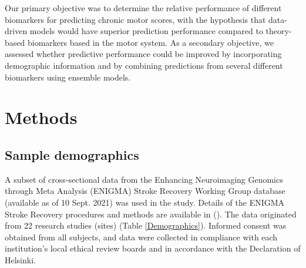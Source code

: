 \documentclass[phd,tocprelim]{cornell}
\begin{document}
Our primary objective was to determine the relative performance of different biomarkers for predicting chronic motor scores, with the hypothesis that data-driven models would have superior prediction performance compared to theory-based biomarkers based in the motor system. As a secondary objective, we assessed whether predictive performance could be improved by incorporating demographic information and by combining predictions from several different biomarkers using ensemble models.

\section{Methods}

\subsection{Sample demographics}
A subset of cross‐sectional data from the Enhancing Neuroimaging Genomics through Meta Analysis (ENIGMA) Stroke Recovery Working Group database (available as of 10 Sept. 2021) was used in the study. Details of the ENIGMA Stroke Recovery procedures and methods are available in (\cite{Liew2020-ps}). The data originated from 22 research studies (sites) (Table \ref{Demographics}). Informed consent was obtained from all subjects, and data were collected in compliance with each institution’s local ethical review boards and in accordance with the Declaration of Helsinki.
\end{document}
